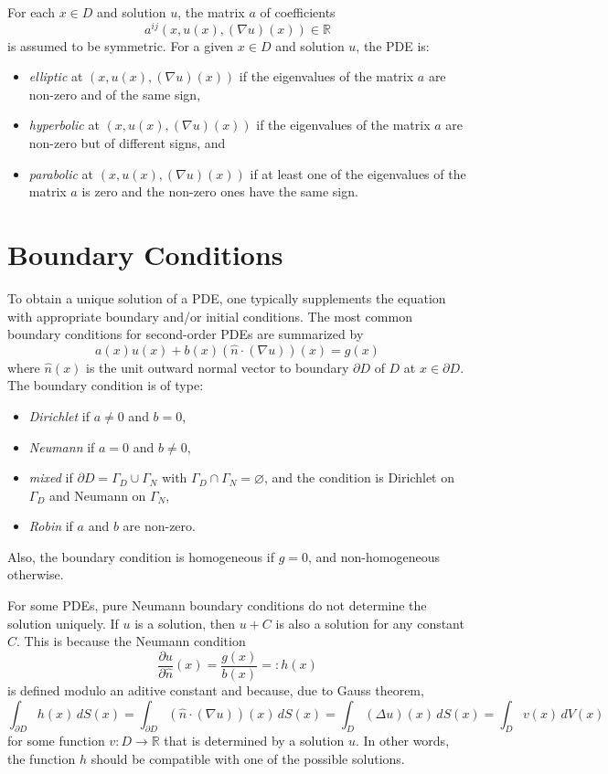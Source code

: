 \documentclass[aps,prl,twocolumn,groupedaddress]{revtex4-2}
\newcommand{\RR}{\mathbb{R}}
\begin{document}
For each $x\in D$ and solution $u$, the matrix $a$ of coefficients
$$
a^{ij}(x,u(x),(\nabla u)(x))
\in \RR
$$
is assumed to be symmetric.
For a given $x\in D$ and solution $u$, the PDE is:
\begin{itemize}
\item {\em elliptic} at $(x,u(x),(\nabla u)(x))$ if the eigenvalues of the matrix $a$ are non-zero and of the same sign,

\item {\em hyperbolic} at $(x,u(x),(\nabla u)(x))$ if the eigenvalues of the matrix $a$ are non-zero but of different signs, and

\item {\em parabolic} at $(x,u(x),(\nabla u)(x))$ if at least one of the eigenvalues of the matrix $a$ is zero and the non-zero ones have the same sign.
\end{itemize}

\section{Boundary Conditions}

To obtain a unique solution of a PDE, one typically supplements the equation with appropriate boundary and/or initial conditions.
The most common boundary conditions for second-order PDEs are summarized by
\begin{equation}
\label{eq:X2}
a(x)u(x) + b(x)(\hat{n}\cdot (\nabla u))(x)
=
g(x)
\end{equation}
where $\hat{n}(x)$ is the unit outward normal vector to boundary $\partial D$ of $D$ at $x\in \partial D$.
The boundary condition is of type:
\begin{itemize}
\item {\em Dirichlet} if $a\neq 0$ and $b=0$,
\item {\em Neumann} if $a=0$ and $b\neq 0$,
\item {\em mixed} if $\partial D=\Gamma_D\cup\Gamma_N$ with
      $\Gamma_D\cap\Gamma_N=\varnothing$,
      and the condition is Dirichlet on $\Gamma_D$
      and Neumann on $\Gamma_N$,
\item {\em Robin} if $a$ and $b$ are non-zero.
\end{itemize}
Also, the boundary condition is homogeneous if $g=0$, and non-homogeneous otherwise.

For some PDEs, pure Neumann boundary conditions do not determine the solution uniquely. 
If $u$ is a solution, then $u+C$ is also a solution for any constant $C$.
This is because the Neumann condition 
$$
\frac{\partial u}{\partial \hat{n}}(x)
=
\frac{g(x)}{b(x)}
=:
h(x)
$$
is defined modulo an aditive constant and because, due to Gauss theorem,
$$
\int_{\partial D} h(x)\,dS(x)
=
\int_{\partial D} (\hat{n}\cdot (\nabla u))(x)\,dS(x)
=
\int_{D} (\Delta u)(x)\,dS(x)
=
\int_{D} v(x)\,dV(x)
$$
for some function $v:D\to \RR$ that is determined by a solution $u$.
In other words, the function $h$ should be compatible with one of the  possible solutions.
\end{document}
